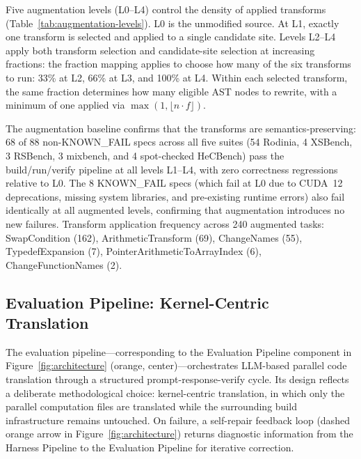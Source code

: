 \documentclass[conference]{IEEEtran}
\begin{document}
Five augmentation levels (L0--L4) control the density of applied transforms (Table~\ref{tab:augmentation-levels}). L0 is the unmodified source. At L1, exactly one transform is selected and applied to a single candidate site. Levels L2--L4 apply both transform selection and candidate-site selection at increasing fractions: the fraction mapping applies to choose how many of the six transforms to run: 33\% at L2, 66\% at L3, and 100\% at L4. Within each selected transform, the same fraction determines how many eligible AST nodes to rewrite, with a minimum of one applied via $\max(1, \lfloor n \cdot f \rfloor)$.

The augmentation baseline confirms that the transforms are semantics-preserving: 68 of 88 non-KNOWN\_FAIL specs across all five suites (54 Rodinia, 4 XSBench, 3 RSBench, 3 mixbench, and 4 spot-checked HeCBench) pass the build/run/verify pipeline at all levels L1--L4, with zero correctness regressions relative to L0. The 8 KNOWN\_FAIL specs (which fail at L0 due to CUDA~12 deprecations, missing system libraries, and pre-existing runtime errors) also fail identically at all augmented levels, confirming that augmentation introduces no new failures. Transform application frequency across 240 augmented tasks: SwapCondition (162), ArithmeticTransform (69), ChangeNames (55), TypedefExpansion (7), PointerArithmeticToArrayIndex (6), ChangeFunctionNames (2).

\subsection{Evaluation Pipeline: Kernel-Centric Translation}
\label{sec:eval-pipeline}

The evaluation pipeline---corresponding to the Evaluation Pipeline component in Figure~\ref{fig:architecture} (orange, center)---orchestrates LLM-based parallel code translation through a structured prompt-response-verify cycle. Its design reflects a deliberate methodological choice: kernel-centric translation, in which only the parallel computation files are translated while the surrounding build infrastructure remains untouched. On failure, a self-repair feedback loop (dashed orange arrow in Figure~\ref{fig:architecture}) returns diagnostic information from the Harness Pipeline to the Evaluation Pipeline for iterative correction.
\end{document}
